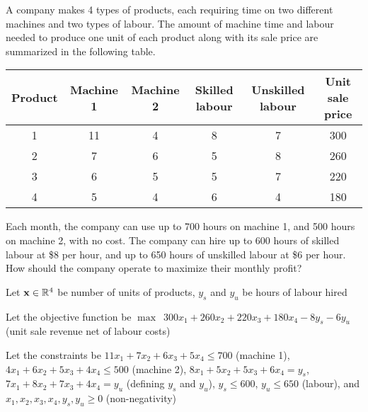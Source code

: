 \begin{example}
  A company makes 4 types of products, each requiring time on two different machines and two types of labour. The amount of machine time and labour needed to produce one unit of each product along with its sale price are summarized in the following table.
  \begin{center}
    \begin{tabular}{c|ccccc}
      Product & Machine 1 & Machine 2 & Skilled labour & Unskilled labour & Unit sale price \\ \hline
      1       & 11        & 4         & 8              & 7                & 300             \\
      2       & 7         & 6         & 5              & 8                & 260             \\
      3       & 6         & 5         & 5              & 7                & 220             \\
      4       & 5         & 4         & 6              & 4                & 180             \\
    \end{tabular}
  \end{center}
  Each month, the company can use up to 700 hours on machine 1, and 500 hours on machine 2, with no cost. The company can hire up to 600 hours of skilled labour at \$8 per hour, and up to 650 hours of unskilled labour at \$6 per hour. How should the company operate to maximize their monthly profit?
\end{example}
\begin{sol}
  Let $\vb x \in \mathbb{R}^4$ be number of units of products, $y_s$ and $y_u$ be hours of labour hired

  Let the objective function be $\max \enspace 300 x_1 + 260 x_2 + 220 x_3 + 180 x_4 - 8y_s - 6y_u$ (unit sale revenue net of labour costs)

  Let the constraints be $11x_1 + 7x_2 + 6x_3 + 5x_4 \leq 700$ (machine 1), $4x_1 + 6x_2 + 5x_3 + 4x_4 \leq 500$ (machine 2), $8x_1 + 5x_2 + 5x_3 + 6x_4 = y_s$, $7x_1 + 8x_2 + 7x_3 + 4x_4 = y_u$ (defining $y_s$ and $y_u$), $y_s \leq 600$, $y_u \leq 650$ (labour), and $x_1, x_2, x_3, x_4, y_s, y_u \geq 0$ (non-negativity)
\end{sol}

